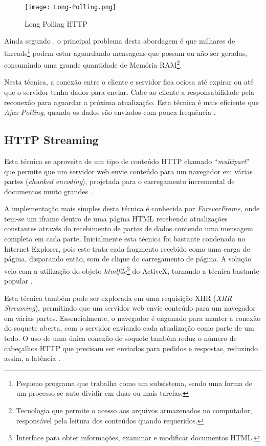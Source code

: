 \begin{figure}[H]
	\centering
	\caption{Long Polling HTTP}
	\texttt{[image: Long-Polling.png]}
	\label{fig:longPolling}
\end{figure}

Ainda segundo , o principal problema desta abordagem é que milhares de threads\footnote{Pequeno programa que trabalha como um subsistema, sendo uma forma de um processo se auto dividir em duas ou mais tarefas.} podem estar aguardando mensagens que possam ou não ser geradas, consumindo uma grande quantidade de Memória RAM\footnote{Tecnologia que permite o acesso aos arquivos armazenados no computador, responsável pela leitura dos conteúdos quando requeridos.}.

Nesta técnica, a conexão entre o cliente e servidor fica ociosa até expirar ou até que o servidor tenha dados para enviar. Cabe ao cliente a responsabilidade pela reconexão para aguardar a próxima atualização. Esta técnica é mais eficiente que \emph{Ajax Polling}, quando os dados são enviados com pouca frequência \cite{gutwin2011real}.

\subsection{HTTP Streaming}

Esta técnica se aproveita de um tipo de conteúdo HTTP chamado “\emph{multipart}” que permite que um servidor web envie conteúdo para um navegador em várias partes (\emph{chunked encoding}), projetada para o carregamento incremental de documentos muito grandes \cite{gutwin2011real}.

A implementação mais simples desta técnica é conhecida por \emph{ForeverFrame}, onde tem-se um iframe dentro de uma página HTML recebendo atualizações constantes através do recebimento de partes de dados contendo uma mensagem completa em cada parte. Inicialmente esta técnica foi bastante condenada no Internet Explorer, pois este trata cada fragmento recebido como uma carga de página, disparando então, som de clique do carregamento de página. A solução veio com a utilização do objeto \emph{htmlfile}\footnote{Interface para obter informações, examinar e modificar documentos HTML.} do ActiveX, tornando a técnica bastante popular \cite{souders2009even}.

Esta técnica também pode ser explorada em uma requisição XHR (\emph{XHR Streaming}), permitindo que um servidor web envie conteúdo para um navegador em várias partes. Essencialmente, o navegador é enganado para manter a conexão do soquete aberta, com o servidor enviando cada atualização como parte de um todo. O uso de uma única conexão de soquete também reduz o número de cabeçalhos HTTP que precisam ser enviados para pedidos e respostas, reduzindo assim, a latência \cite{gutwin2011real}.

